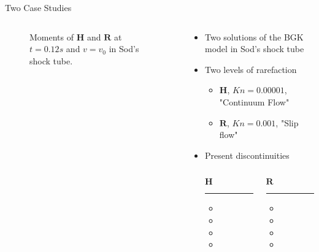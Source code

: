 \documentclass[usenames,dvipsnames,Nike]{tuberlinbeamer}
\begin{document}
\begin{frame}[fragile]{Two Case Studies}
	\begin{columns}
		\begin{column}{.5\textwidth}
			\begin{figure}
				
				\caption{Moments of $\mathbf{H}$ and $\mathbf{R}$ at $t=0.12s$ and $v=v_0$ in Sod's shock tube.}
			\end{figure}
		\end{column}
		\begin{column}{.5\textwidth}
			\begin{itemize}
				\item Two solutions of the BGK model in Sod's shock tube
				\item Two levels of rarefaction
				\begin{itemize}
					\item $\mathbf{H}$, $Kn=0.00001$, "Continuum Flow"
					\item $\mathbf{R}$, $Kn=0.001$, "Slip flow"
				\end{itemize}
				\item Present discontinuities
			\begin{columns}
				\begin{column}{.3\textwidth}
					$\mathbf{H}$
					\hrule
					\begin{itemize}
						\item {}
						\item {}
						\item {}
						\item {}
					\end{itemize}
				\end{column}
				\begin{column}{.3\textwidth}
					$\mathbf{R}$
					\hrule
					\begin{itemize}
						\item {}
						\item {}
						\item {}
						\item {}
					\end{itemize}
				\end{column}
			\end{columns}
			\end{itemize}
		\end{column}
	\end{columns}
\end{frame}
\end{document}
